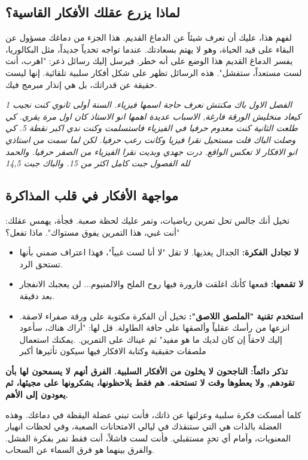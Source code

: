 \documentclass[12pt,a4paper]{book}
\newcommand{\quoteAr}[1]{%
	\begin{myquote}
		\itshape #1
	\end{myquote}
}
\newcommand{\importantAr}[1]{%
	\begin{important}
		\bfseries #1
	\end{important}
}
\begin{document}
	\subsection{لماذا يزرع عقلك الأفكار القاسية؟}
	
	لفهم هذا، عليك أن تعرف شيئاً عن الدماغ القديم. هذا الجزء من دماغك مسؤول عن البقاء على قيد الحياة، وهو لا يهتم بسعادتك. عندما تواجه تحدياً جديداً، مثل البكالوريا، يفسر الدماغ القديم هذا الوضع على أنه خطر. فيرسل إليك رسائل ذعر: "اهرب، أنت لست مستعداً، ستفشل". هذه الرسائل تظهر على شكل أفكار سلبية تلقائية. إنها ليست حقيقة عن قدراتك، بل هي إنذار مبرمج فيك.

	\quoteAr{الفصل الاول باك مكنتش نعرف حاجة اسمها فيزياء. السنة أولى ثانوي كنت نجيب 1 كيعاد منخليش الورقة فارغة, الاسباب عديدة اهمها انو الاستاذ كان اول مرة يقري. كي طلعت الثانية كنت معدوم حرفيا في الفيزياء فاستسلمت وكنت ندي اكبر نقطة 5. كي وصلت الباك قلت مستحيل نقرا فيزيا وكانت رعب حرفيا. لكن لما سمت من استاذي انو الافكار لا تعكس الواقع. درت جهدي وبديت نقرا الفيزياء من الصفر حرفيا. والحمد لله الفصول جبت كامل اكثر من 15. والباك جبت 14,5}

	\subsection{ مواجهة الأفكار في قلب المذاكرة}
	
	تخيل أنك جالس تحل تمرين رياضيات، وتمر عليك لحظة صعبة. فجأة، يهمس عقلك: "أنت غبي، هذا التمرين يفوق مستواك". ماذا تفعل؟
	
	\begin{itemize}
		\item \textbf{لا تجادل الفكرة:} الجدال يغذيها. لا تقل "لا أنا لست غبياً"، فهذا اعتراف ضمني بأنها تستحق الرد.
		\item \textbf{لا تقمعها:} قمعها كأنك اغلقت قارورة فيها روح الملح والالمنيوم... لن يعجبك الانفجار بعد دقيقة.
		\item \textbf{استخدم تقنية "الملصق اللاصق":} تخيل أن الفكرة مكتوبة على ورقة صفراء لاصقة. انزعها من رأسك عقلياً وألصقها على حافة الطاولة. قل لها: "أراك هناك، سأعود إليك لاحقاً إن كان لديك ما هو مفيد" ثم عيناك على التمرين. .يمكنك استعمال ملصقات حقيقية وكتابة الافكار فيها سيكون تأثيرها أكبر
	\end{itemize}
	
	\importantAr{تذكر دائماً: الناجحون لا يخلون من الأفكار السلبية. الفرق أنهم لا يسمحون لها بأن تقودهم, ولا يعطوها وقت لا تستحقه. هم فقط يلاحظونها، يشكرونها على مجيئها، ثم يعودون إلى الأهم.}
	
	كلما أمسكت فكرة سلبية وعزلتها عن ذاتك، فأنت تبني عضلة اليقظة في دماغك. وهذه العضلة بالذات هي التي ستنقذك في ليالي الامتحانات الصعبة، وفي لحظات انهيار المعنويات، وأمام أي تحدٍ مستقبلي. فأنت لست فاشلاً، أنت فقط تمر بفكرة الفشل. والفرق بينهما هو فرق السماء عن السحاب.
	
\end{document}
